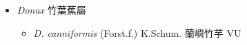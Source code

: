 
  \begin{itemize}
 \item[] \textit{Donax} 竹葉蕉屬
                                
  \begin{itemize}
        \item[] \textit{D. canniformis} (Forst.f.) K.Schum.  蘭嶼竹芋   VU
  \end{itemize}
  \end{itemize}
